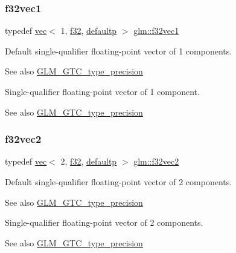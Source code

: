 \subsubsection{\texorpdfstring{f32vec1}{f32vec1}}
{\footnotesize\ttfamily typedef \mbox{\hyperlink{structglm_1_1vec}{vec}}$<$ 1, \mbox{\hyperlink{group__gtc__type__precision_ga0ec999b57f5330d9021256e96038df04}{f32}}, \mbox{\hyperlink{namespaceglm_a36ed105b07c7746804d7fdc7cc90ff25a9d21ccd8b5a009ec7eb7677befc3bf51}{defaultp}} $>$ \mbox{\hyperlink{group__gtc__type__precision_ga27d40e360fd5b6ad39ca34ded8210b53}{glm\+::f32vec1}}}

Default single-\/qualifier floating-\/point vector of 1 components. \begin{DoxySeeAlso}{See also}
\mbox{\hyperlink{group__gtc__type__precision}{G\+L\+M\+\_\+\+G\+T\+C\+\_\+type\+\_\+precision}}
\end{DoxySeeAlso}
Single-\/qualifier floating-\/point vector of 1 component. \begin{DoxySeeAlso}{See also}
\mbox{\hyperlink{group__gtc__type__precision}{G\+L\+M\+\_\+\+G\+T\+C\+\_\+type\+\_\+precision}} 
\end{DoxySeeAlso}
\mbox{\label{group__gtc__type__precision_gaeb896022a9c59e8c3c4ce627c66c9262}} 
\subsubsection{\texorpdfstring{f32vec2}{f32vec2}}
{\footnotesize\ttfamily typedef \mbox{\hyperlink{structglm_1_1vec}{vec}}$<$ 2, \mbox{\hyperlink{group__gtc__type__precision_ga0ec999b57f5330d9021256e96038df04}{f32}}, \mbox{\hyperlink{namespaceglm_a36ed105b07c7746804d7fdc7cc90ff25a9d21ccd8b5a009ec7eb7677befc3bf51}{defaultp}} $>$ \mbox{\hyperlink{group__gtc__type__precision_gaeb896022a9c59e8c3c4ce627c66c9262}{glm\+::f32vec2}}}

Default single-\/qualifier floating-\/point vector of 2 components. \begin{DoxySeeAlso}{See also}
\mbox{\hyperlink{group__gtc__type__precision}{G\+L\+M\+\_\+\+G\+T\+C\+\_\+type\+\_\+precision}}
\end{DoxySeeAlso}
Single-\/qualifier floating-\/point vector of 2 components. \begin{DoxySeeAlso}{See also}
\mbox{\hyperlink{group__gtc__type__precision}{G\+L\+M\+\_\+\+G\+T\+C\+\_\+type\+\_\+precision}} 
\end{DoxySeeAlso}
\mbox{\label{group__gtc__type__precision_ga4d08db2a75d1e8f85e0edbbd76f18ecf}} 
